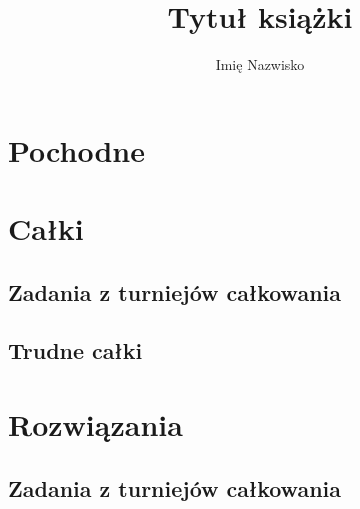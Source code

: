 \documentclass[9pt, twoside, a5paper]{extbook}
\author{Imię Nazwisko}
\title{Tytuł książki}
\theoremstyle{remark}
\begin{document}






\raggedbottom

\chapter{Pochodne}


\chapter{Całki}





	

\section{Zadania z turniejów całkowania}
	



\section{Trudne całki}
	
	
	

\chapter{Rozwiązania}
% 
% 
% 
% 
% 


\section{Zadania z turniejów całkowania}
	
\end{document}
